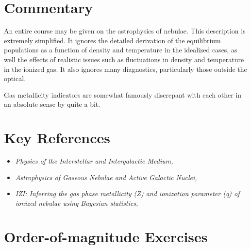 \section{Commentary}

An entire course may be given on the astrophysics of nebulae. This
description is extremely simplified. It ignores the detailed
derivation of the equilibrium populations as a function of density and
temperature in the idealized cases, as well the effects of realistic
issues such as fluctuations in density and temperature in the ionized
gas. It also ignores many diagnostics, particularly those outside the
optical.

Gas metallicity indicators are somewhat famously discrepant with each
other in an absolute sense by quite a bit.

\section{Key References}

\begin{itemize}
  \item {\it Physics of the Interstellar and Intergalactic
    Medium, }

  \item {\it Astrophysics of Gaseous Nebulae and Active Galactic
    Nuclei, \citet{osterbrock06a}}

  \item {\it IZI: Inferring the gas phase metallicity (Z) and
    ionization parameter (q) of ionized nebulae using Bayesian
    statistics, \citet{blanc15a}}
\end{itemize}

\section{Order-of-magnitude Exercises}

